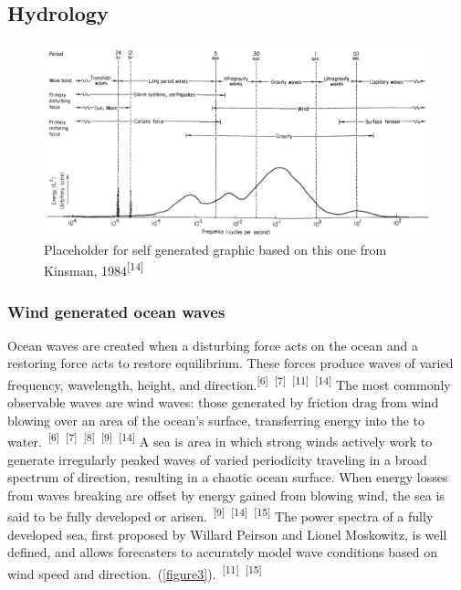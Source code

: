 \documentclass{article}
\begin{document}
\subsection{Hydrology}


\begin{figure} 
    \centering
    \includegraphics[width=1\linewidth]{images/ocean-wave-energy-schematic.png}
    \caption{Placeholder for self generated graphic based on this one from Kinsman, 1984\textsuperscript{[14]}}
    \label{figure2}
\end{figure}

\subsubsection{Wind generated ocean waves}


\par{\hspace{.5cm}Ocean waves are created when a disturbing force acts on the ocean and a restoring force acts to restore equilibrium. These forces produce waves of varied frequency, wavelength, height, and direction.\textsuperscript{[6]}~\textsuperscript{[7]}~\textsuperscript{[11]}~\textsuperscript{[14]} The most commonly observable waves are wind waves: those generated by friction drag from wind blowing over an area of the ocean's surface, transferring energy into the to water.~\textsuperscript{[6]}~\textsuperscript{[7]}~\textsuperscript{[8]}~\textsuperscript{[9]}~\textsuperscript{[14]} A sea is area in which strong winds actively work to generate irregularly peaked waves of varied periodicity traveling in a broad spectrum of direction, resulting in a chaotic ocean surface. When energy losses from waves breaking are offset by energy gained from blowing wind, the sea is said to be fully developed or arisen.~\textsuperscript{[9]}~\textsuperscript{[14]}~\textsuperscript{[15]} The power spectra of a fully developed sea, first proposed by Willard Peirson and Lionel Moskowitz, is well defined, and allows forecasters to accurately model wave conditions based on wind speed and direction.~(\cref{figure3}).~\textsuperscript{[11]}~\textsuperscript{[15]}}
\end{document}
